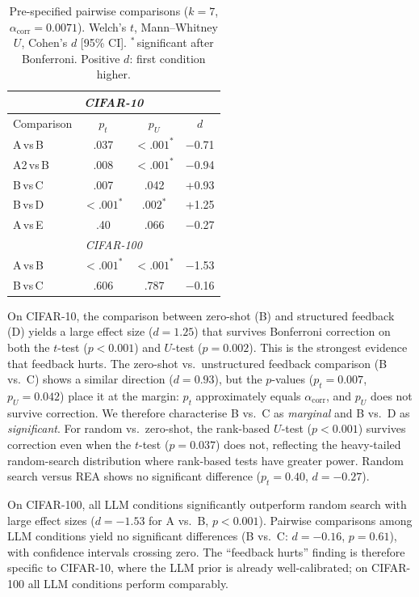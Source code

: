 \documentclass[10pt]{article}
\begin{document}
\begin{table}[t]
\centering\footnotesize
\caption{Pre-specified pairwise comparisons ($k{=}7$,
$\alpha_{\mathrm{corr}}{=}0.0071$).  Welch's $t$, Mann--Whitney $U$,
Cohen's $d$ [95\% CI].  $^*$\,significant after Bonferroni.  Positive $d$:
first condition higher.}
\label{tab:stats_key}
\begin{tabular}{@{}l ccc@{}}
\toprule
\multicolumn{4}{c}{\textit{CIFAR-10}} \\
\midrule
Comparison & $p_t$ & $p_U$ & $d$ \\
\midrule
A\,vs\,B   & .037  & ${<}.001^*$ & $-$0.71 \\
A2\,vs\,B  & .008  & ${<}.001^*$ & $-$0.94 \\
B\,vs\,C   & .007  & .042        & +0.93 \\
B\,vs\,D   & ${<}.001^*$ & $.002^*$ & +1.25 \\
A\,vs\,E   & .40   & .066        & $-$0.27 \\
\midrule
\multicolumn{4}{c}{\textit{CIFAR-100}} \\
\midrule
A\,vs\,B   & ${<}.001^*$ & ${<}.001^*$ & $-$1.53 \\
B\,vs\,C   & .606  & .787        & $-$0.16 \\
\bottomrule
\end{tabular}
\end{table}

On CIFAR-10, the comparison between zero-shot (B) and structured feedback
(D) yields a large effect size ($d{=}1.25$) that survives Bonferroni correction
on both the $t$-test ($p{<}0.001$) and $U$-test ($p{=}0.002$).  This is the
strongest evidence that feedback hurts.  The zero-shot vs.\ unstructured
feedback comparison (B vs.\ C) shows a similar direction ($d{=}0.93$), but the
$p$-values ($p_t{=}0.007$, $p_U{=}0.042$) place it at the margin: $p_t$
approximately equals $\alpha_{\mathrm{corr}}$, and $p_U$ does not survive
correction.  We therefore characterise B vs.\ C as \emph{marginal} and B vs.\ D
as \emph{significant}.  For random vs.\ zero-shot, the rank-based $U$-test
($p{<}0.001$) survives correction even when the $t$-test ($p{=}0.037$) does
not, reflecting the heavy-tailed random-search distribution where rank-based
tests have greater power.  Random search versus REA shows no significant
difference ($p_t{=}0.40$, $d{=}{-}0.27$).

On CIFAR-100, all LLM conditions significantly outperform random search with
large effect sizes ($d{=}{-}1.53$ for A vs.\ B, $p{<}0.001$).  Pairwise
comparisons among LLM conditions yield no significant differences (B vs.\ C:
$d{=}{-}0.16$, $p{=}0.61$), with confidence intervals crossing zero.  The
``feedback hurts'' finding is therefore specific to CIFAR-10, where the LLM
prior is already well-calibrated; on CIFAR-100 all LLM conditions perform
comparably.
\end{document}
